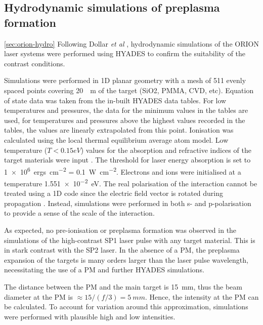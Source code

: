 \subsection{Hydrodynamic simulations of preplasma formation}\ref{sec:orion-hydro}
Following Dollar \textit{et al} \cite{dollarScalingHighorderHarmonic2013}, hydrodynamic simulations of the ORION laser systems were performed using HYADES to confirm the suitability of the contrast conditions.

Simulations were performed in 1D planar geometry with a mesh of 511 evenly spaced points covering \qty{20}{\mu m} of the target (SiO2, PMMA, CVD, etc). Equation of state data was taken from the in-built HYADES data tables. For low temperatures and pressures, the data for the minimum values in the tables are used, for temperatures and pressures above the highest values recorded in the tables, the values are linearly extrapolated from this point. Ionisation was calculated using the local thermal equilibrium average atom model. Low temperature ($T < 0.15 eV$) values for the absorption and refractive indices of the target materials were input \cite{polyanskiyRefractiveindexInfoDatabase2024}.
The threshold for laser energy absorption is set to \qty{1e6}{ergs.cm^{-2}} = \qty{0.1}{W.cm^{-2}}. Electrons and ions were initialised at a temperature \qty{1.551e-2}{eV}. The real polarisation of the interaction cannot be treated using a 1D code since the electric field vector is rotated during propagation \cite{larsenQuestionSourceWave2023}. Instead, simulations were performed in both s- and p-polarisation to provide a sense of the scale of the interaction.

As expected, no pre-ionisation or preplasma formation was observed in the simulations of the high-contrast SP1 laser pulse with any target material. This is in stark contrast with the SP2 laser. In the absence of a PM, the preplasma expansion of the targets is many orders larger than the laser pulse wavelength, necessitating the use of a PM and further HYADES simulations.

The distance between the PM and the main target is \qty{15}{mm}, thus the beam diameter at the PM is $\approx 15/(f/3) = \qty{5}{mm}$. Hence, the intensity at the PM can be calculated. To account for variation around this approximation, simulations were performed with plausible high and low intensities.

